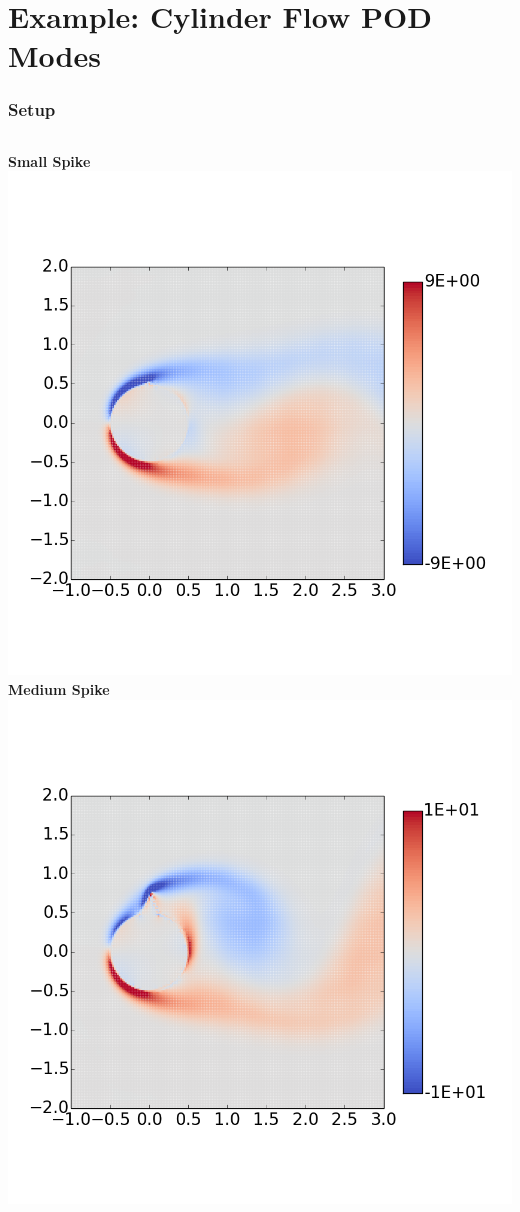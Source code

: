 \documentclass[9pt]{beamer}
\begin{document}
\section{Example: Cylinder Flow POD Modes}
\label{sec-3}
\begin{frame}
\frametitle{Setup}
\label{sec-3-1}

\begin{columns}[c]
   \centering
    \textbf{Small Spike} \\
    \includegraphics[width=1\textwidth]{PerturbSmallHorn}
   \centering
    \textbf{Medium Spike} \\
    \includegraphics[width=1\textwidth]{PerturbMediumHorn}

\end{columns}
\end{frame}
\end{document}
